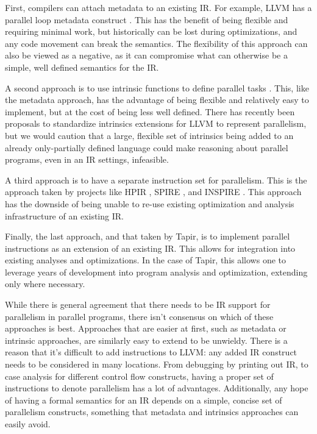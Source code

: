 \documentclass[sigconf]{acmart}
\begin{document}
First, compilers can attach metadata to an existing IR. For example, LLVM has a
parallel loop metadata construct \cite{}. This has the benefit of being
flexible and requiring minimal work, but historically can be lost during
optimizations, and any code movement can break the semantics. The flexibility
of this approach can also be viewed as a negative, as it can compromise
what can otherwise be a simple, well defined semantics for the IR. 

A second approach is to use intrinsic functions to define parallel tasks
\cite{ares}. This, like the metadata approach, has the advantage of being
flexible and relatively easy to implement, but at the cost of being less well
defined. There has recently been proposals to standardize intrinsics extensions
for LLVM to represent parallelism, but we would caution that a large, flexible
set of intrinsics being added to an already only-partially defined
\cite{verillvm} language could make reasoning about parallel programs, even
in an IR settings, infeasible. 

A third approach is to have a separate instruction set for parallelism. This is
the approach taken by projects like HPIR \cite{}, SPIRE \cite{}, and INSPIRE
\cite{}. This approach has the downside of being unable to re-use existing
optimization and analysis infrastructure of an existing IR. 

Finally, the last approach, and that taken by Tapir, is to implement parallel 
instructions as an extension of an existing IR. This allows for integration
into existing analyses and optimizations. In the case of Tapir, this allows one
to leverage years of development into program analysis and optimization,
extending only where necessary. 

While there is general agreement that there needs to be IR support for
parallelism in parallel programs, there isn't consensus on which of these
approaches is best. Approaches that are easier at first, such as metadata
or intrinsic approaches, are similarly easy to extend to be unwieldy. There is
a reason that it's difficult to add instructions to LLVM: any added IR
construct needs to be considered in many locations. From debugging by printing
out IR, to case analysis for different control flow constructs, having 
a proper set of instructions to denote parallelism has a lot of advantages. 
Additionally, any hope of having a formal semantics for an IR depends on a 
simple, concise set of parallelism constructs, something that metadata and
intrinsics approaches can easily avoid. 
\end{document}

